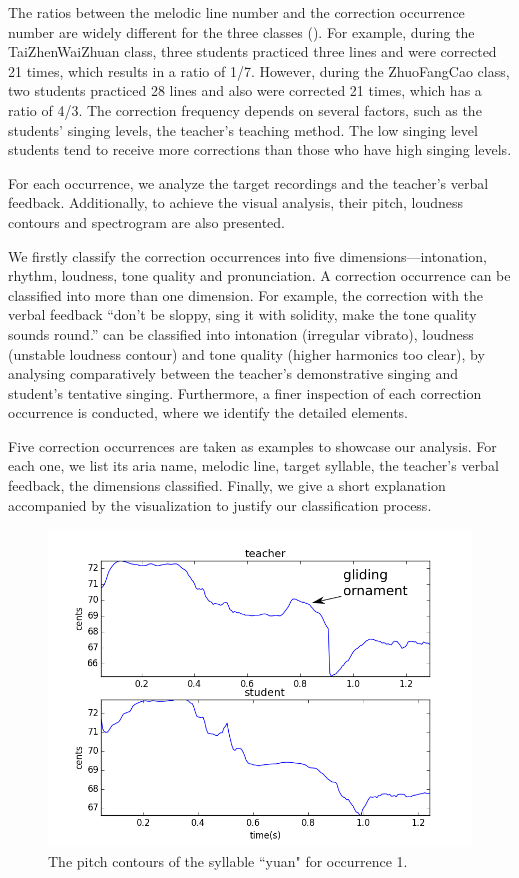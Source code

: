 The ratios between the melodic line number and the correction occurrence number are widely different for the three classes (). For example, during the TaiZhenWaiZhuan class, three students practiced three lines and were corrected 21 times, which results in a ratio of 1/7. However, during the ZhuoFangCao class, two students practiced 28 lines and also were corrected 21 times, which has a ratio of 4/3. The correction frequency depends on several factors, such as the students' singing levels, the teacher's teaching method. The low singing level students tend to receive more corrections than those who have high singing levels.

For each occurrence, we analyze the target recordings and the teacher's verbal feedback. Additionally, to achieve the visual analysis, their pitch, loudness contours and spectrogram are also presented.

We firstly classify the correction occurrences into five dimensions—intonation, rhythm, loudness, tone quality and pronunciation. A correction occurrence can be classified into more than one dimension. For example, the correction with the verbal feedback “don't be sloppy, sing it with solidity, make the tone quality sounds round.” can be classified into intonation (irregular vibrato), loudness (unstable loudness contour) and tone quality (higher harmonics too clear), by analysing comparatively between the teacher's demonstrative singing and student's tentative singing. Furthermore, a finer inspection of each correction occurrence is conducted, where we identify the detailed elements.

Five correction occurrences are taken as examples to showcase our analysis. For each one, we list its aria name, melodic line, target syllable, the teacher's verbal feedback, the dimensions classified. Finally, we give a short explanation accompanied by the visualization to justify our classification process.

\begin{figure}[ht!]
\includegraphics[width=\textwidth]{figs/spectro_vis/ch3_occ1.png}
\caption{The pitch contours of the syllable ``yuan" for occurrence 1.}
\label{fig:occurrence_1}
\end{figure}

